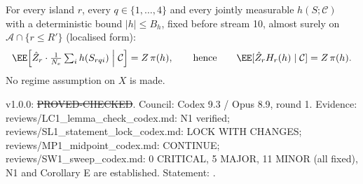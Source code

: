 \begin{theorem}[N1]\label{reg:W1-N1_Thm-N1}
For every island $r$, every $q\in\{1,\dots,4\}$ and every jointly measurable $h(S;\mathcal C)$ with a deterministic bound $|h|\le B_h$, fixed before stream 10, almost surely on $\mathcal A\cap\{r\le R'\}$ (localised form):
\[
\EE\Bigl[\hat{Z}_r\cdot\tfrac1{N_e}\textstyle\sum_ih(S_{rqi})\Bigm|\mathcal C\Bigr]=Z\,\pi(h),\qquad\text{hence}\qquad \EE[\hat{Z}_rH_r(h)\mid\mathcal C]=Z\,\pi(h).
\]
No regime assumption on $X$ is made.
\end{theorem}
\begin{statusbox}
 v1.0.0: \st{PROVED-CHECKED}. Council: Codex 9.3 / Opus 8.9, round 1. Evidence: reviews/LC1\_lemma\_check\_codex.md: N1 verified; reviews/SL1\_statement\_lock\_codex.md: LOCK WITH CHANGES; reviews/MP1\_midpoint\_codex.md: CONTINUE; reviews/SW1\_sweep\_codex.md: 0 CRITICAL, 5 MAJOR, 11 MINOR (all fixed), N1 and Corollary E are established. Statement: .
\end{statusbox}
